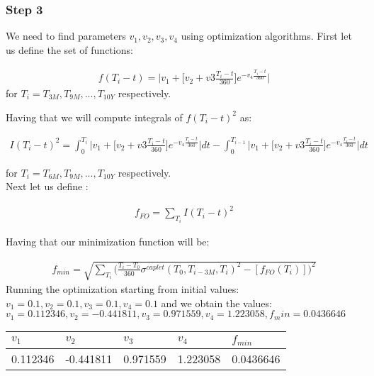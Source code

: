 \documentclass[11pt]{article}
\numberwithin{equation}{subsection}
\begin{document}
\subsubsection*{Step 3}
We need to find parameters \(v_1, v_2, v_3, v_4\) using optimization algorithms. First let us define
the set of functions:

\begin{eqnarray*}
	f(T_i - t) = \mathrel{\bigg|} v_1 + \bigg[v_2 + v3 \frac{T_i-t}{360}\bigg] e^{-v_4 \frac{T_i-t}{360}} \mathrel{\bigg|}
\end{eqnarray*}
for \(T_i = T_{3M}, T_{9M},..., T_{10Y}\) respectively.

Having that we will compute integrals of \(f(T_i - t)^2\) as:

\begin{eqnarray*}
	I(T_i - t)^2 = \int_{0}^{T_i} \mathrel{\bigg|} v_1 + \bigg[v_2 + v3 \frac{T_i-t}{360}\bigg] e^{-v_4 \frac{T_i-t}{360}} \mathrel{\Bigg|} dt
	- \int_{0}^{T_{i-1}} \mathrel{\Bigg|} v_1 + \bigg[v_2 + v3 \frac{T_i-t}{360}\bigg] e^{-v_4 \frac{T_i-t}{360}} \mathrel{\bigg|} dt
\end{eqnarray*}

for \(T_i = T_{6M}, T_{9M},..., T_{10Y}\) respectively.\\
Next let us define :

\begin{eqnarray*}
	f_{FO} = \sum_{T_i} I(T_i - t)^2
\end{eqnarray*}

Having that our minimization function will be:

\begin{eqnarray*}
	f_{min} = \sqrt{\sum_{T_i}\bigg(\frac{T_i-T_0}{360} \sigma^{caplet}(T_0, T_{i-3M}, T_i)^2 - [f_{FO}(T_i)]\bigg)^2}
\end{eqnarray*}
Running the optimization starting from initial values: \(v_1=0.1, v_2=0.1, v_3=0.1, v_4=0.1\) and 
we obtain the values: \(v_1=0.112346, v_2=-0.441811, v_3=0.971559, v_4=1.223058, f_min=0.0436646\) 

\vskip 0.2cm 		
{
	\begin{center}
		\begin{tabular}{lllll}
			\hline
			\(v_1\)   & \(v_2\)  & \(v_3\)  & \(v_4\)  & \(f_{min}\) \\
			\hline
			 0.112346 & -0.441811 & 0.971559 & 1.223058 & 0.0436646 \\			
			\hline				 				
		\end{tabular}
	\end{center}
}
\vskip 0.4cm
\end{document}
